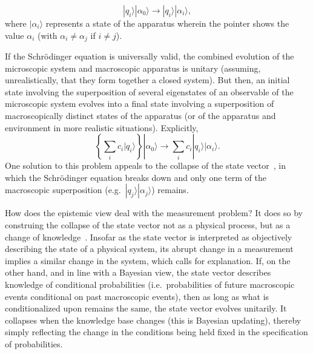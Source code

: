 \documentclass[12pt]{article}
\begin{document}
\begin{equation}
|q_i \rangle |\alpha_0 \rangle \rightarrow
|q_i \rangle |\alpha_i \rangle ,
\end{equation}
%
where $|\alpha_i \rangle$ represents a state of the
apparatus wherein the pointer shows the value
$\alpha_i$ (with $\alpha_i \neq \alpha_j$ 
if $i \neq j$).

\fussy
If the Schr\"{o}dinger equation is universally
valid, the combined evolution of the microscopic
system and macroscopic apparatus is unitary (assuming,
unrealistically, that they form together a closed system).
But then, an initial state involving the superposition
of several eigenstates of an observable of the microscopic system
evolves into a final state involving a superposition of
macroscopically distinct states of the apparatus
(or of the apparatus and environment in more
realistic situations).  Explicitly,
%
\begin{equation}
\left\{ \sum_i c_i |q_i \rangle \right\}
|\alpha_0 \rangle \rightarrow
\sum_i c_i |q_i \rangle |\alpha_i \rangle .
\end{equation}
%
One solution to this problem appeals to the collapse
of the state vector~\cite{neumann}, in which the
Schr\"{o}dinger equation breaks down and only one term
of the macroscopic superposition (e.g.\
$|q_j \rangle |\alpha_j \rangle$) remains.

How does the epistemic view deal with the
measurement problem?  It does so by construing
the collapse of the state vector not as a
physical process, but as a change of
knowledge~\cite{peierls}.  Insofar as the state
vector is interpreted as objectively describing
the state of a physical system, its abrupt change
in a measurement
implies a similar change in the system, which
calls for explanation.  If, on the other hand,
and in line with a Bayesian view,
the state vector describes knowledge of
conditional probabilities (i.e.\ probabilities of
future macroscopic events conditional on past
macroscopic events), then as long as what is 
conditionalized upon remains the same, the state
vector evolves unitarily.  It collapses when the
knowledge base changes (this is Bayesian updating),
thereby simply reflecting
the change in the conditions being held fixed
in the specification of probabilities.
\end{document}
